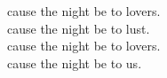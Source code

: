 cause the night be to lovers. \\
cause the night be to lust. \\
cause the night be to lovers. \\
cause the night be to us. \\


